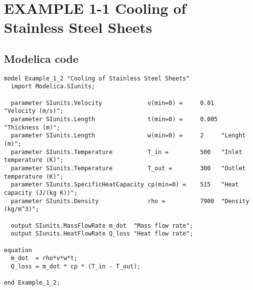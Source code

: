 \documentclass{modelica}
\begin{document}
\thispagestyle{empty}
\date{} %

\section*{EXAMPLE 1-1 Cooling of Stainless Steel Sheets}

\subsection*{Modelica code}


\begin{lstlisting}[mathescape=true] 
model Example_1_2 "Cooling of Stainless Steel Sheets"
  import Modelica.SIunits;

  parameter SIunits.Velocity             v(min=0) =     0.01  "Velocity (m/s)";
  parameter SIunits.Length               t(min=0) =     0.005 "Thickness (m)";
  parameter SIunits.Length               w(min=0) =     2     "Lenght (m)";
  parameter SIunits.Temperature          T_in =         500   "Inlet temperature (K)";
  parameter SIunits.Temperature          T_out =        300   "Outlet temperature (K)";
  parameter SIunits.SpecificHeatCapacity cp(min=0) =    515   "Heat capacity (J/(kg K))";
  parameter SIunits.Density              rho =          7900  "Density (kg/m^3)";

  output SIunits.MassFlowRate m_dot  "Mass flow rate";
  output SIunits.HeatFlowRate Q_loss "Heat flow rate";

equation 
  m_dot  = rho*v*w*t;
  Q_loss = m_dot * cp * (T_in - T_out);
  
end Example_1_2;  
\end{lstlisting}
\end{document}
